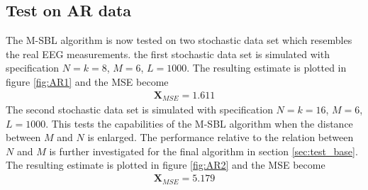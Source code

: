 \subsection{Test on AR data}
The M-SBL algorithm is now tested on two stochastic data set which resembles the real EEG measurements. 
the first stochastic data set is simulated with specification $N=k=8$, $M = 6$, $L=1000$. The resulting estimate is plotted in figure \ref{fig:AR1} and the MSE become 
\begin{align*}
\textbf{X}_{MSE} = 1.611 
\end{align*}  
The second stochastic data set is simulated with specification $N=k=16$, $M = 6$, $L=1000$. This tests the capabilities of the M-SBL algorithm when the distance between $M$ and $N$ is enlarged. The performance relative to the relation between $N$ and $M$ is further investigated for the final algorithm in section \ref{sec:test_base}.
The resulting estimate is plotted in figure \ref{fig:AR2} and the MSE become 
\begin{align*}
\textbf{X}_{MSE} = 5.179 
\end{align*}  

